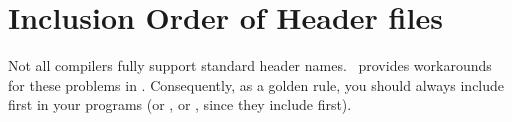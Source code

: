 








\section{Inclusion Order of Header files}
Not all compilers fully support standard header names. \cgal\ provides 
workarounds for these problems in . Consequently, as a 
golden rule, you should always include  first in your 
programs (or , or , since they 
include  first).





